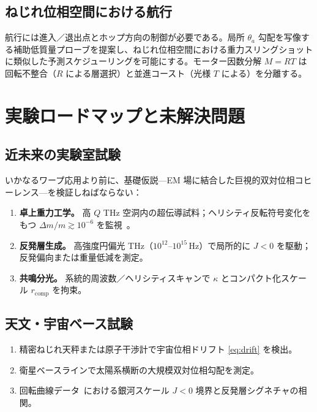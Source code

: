 \documentclass[dvipdfmx,a4paper]{article}
\theoremstyle{definition}
\begin{document}
\subsection{ねじれ位相空間における航行}

航行には進入／退出点とホップ方向の制御が必要である。局所 $\theta_a$ 勾配を写像する補助低質量プローブを提案し、ねじれ位相空間における重力スリングショットに類似した予測スケジューリングを可能にする。モーター因数分解 $M=RT$ は回転不整合（$R$ による層選択）と並進コースト（光様 $T$ による）を分離する。

\section{実験ロードマップと未解決問題}
\label{sec:roadmap}

\subsection{近未来の実験室試験}

いかなるワープ応用より前に、基礎仮説---EM 場に結合した巨視的双対位相コヒーレンス---を検証しねばならない：
\begin{enumerate}[leftmargin=2em]
  \item \textbf{卓上重力工学。} 高 $Q$ THz 空洞内の超伝導試料；ヘリシティ反転符号変化をもつ $\Delta m/m\gtrsim 10^{-6}$ を監視~\cite{dual2025}。
  \item \textbf{反発層生成。} 高強度円偏光 THz（$10^{12}$--$10^{15}\,\mathrm{Hz}$）で局所的に $J<0$ を駆動；反発偏向または重量低減を測定。
  \item \textbf{共鳴分光。} 系統的周波数／ヘリシティスキャンで $\kappa$ とコンパクト化スケール $r_{\mathrm{comp}}$ を拘束。
\end{enumerate}

\subsection{天文・宇宙ベース試験}

\begin{enumerate}[leftmargin=2em]
  \item 精密ねじれ天秤または原子干渉計で宇宙位相ドリフト \eqref{eq:drift} を検出。
  \item 衛星ベースラインで太陽系横断の大規模双対位相勾配を測定。
  \item 回転曲線データ~\cite{dual2025}における銀河スケール $J<0$ 境界と反発層シグネチャの相関。
\end{enumerate}
\end{document}
